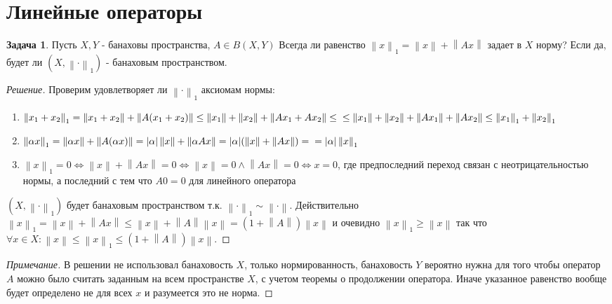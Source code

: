 \documentclass[12pt,a4paper]{article}
\theoremstyle{definition}
\newtheorem{exercise}{Задача}[section]
\newenvironment{solution}
{\renewcommand\qedsymbol{$\blacksquare$}\begin{proof}[Решение]}
{\end{proof}}
\newenvironment{note}
{\renewcommand\qedsymbol{}\begin{proof}[Примечание]}
	{\end{proof}}
\newcommand{\norm}[1]{\left\lVert#1\right\rVert}
\begin{document}
	\section{Линейные операторы}
	
	\begin{exercise}
		Пусть $X,Y$ - банаховы пространства, $A\in B(X,Y)$ Всегда ли равенство $\norm{x}_1 = \norm{x} + \norm{Ax}$ задает в $X$ норму? Если да, будет ли $(X, \norm{\cdot}_1)$ - банаховым пространством.
	\end{exercise}
	\begin{solution}
		Проверим удовлетворяет ли $\norm{\cdot}_1$ аксиомам нормы:
		\begin{enumerate}
			\item $\norm{x_1 + x_2}_1 = \norm{x_1 + x_2} + \norm{A(x_1 + x_2)} \leq \norm{x_1} + \norm{x_2} + \norm{Ax_1 + Ax_2} \leq \newline
			\leq \norm{x_1} + \norm{x_2} + \norm{Ax_1} + \norm{Ax_2}
			\leq \norm{x_1}_1 + \norm{x_2}_1$
			
			\item $\norm{\alpha x}_1 = \norm{\alpha x} + \norm{A(\alpha x)} = |\alpha| \norm{x} + \norm{\alpha Ax} = |\alpha| (\norm{x} + \norm{Ax}) = \newline = |\alpha|\norm{x}_1$
			
			\item $\norm{x}_1 = 0 \Leftrightarrow \norm{x} + \norm{Ax} = 0 \Leftrightarrow \norm{x} = 0 \wedge \norm{Ax} = 0 \Leftrightarrow x = 0$, где предпоследний переход связан с неотрицательностью нормы, а последний с тем что $A0=0$ для линейного оператора
		\end{enumerate}
		$(X, \norm{\cdot}_1)$ будет банаховым пространством т.к. $\norm{\cdot}_1 \sim \norm{\cdot}$. Действительно $\norm{x}_1 = \norm{x} + \norm{Ax} \leq \norm{x} + \norm{A}\norm{x} = (1 + \norm{A})\norm{x}$ и очевидно $\norm{x}_1 \geq \norm{x}$ так что
		$\forall x\in X : \norm{x} \leq \norm{x}_1 \leq (1 + \norm{A})\norm{x}$.
	\end{solution}

	\begin{note}
		В решении не использовал банаховость $X$, только нормированность, банаховость $Y$ вероятно нужна для того чтобы оператор $A$ можно было считать заданным на всем пространстве $X$, с учетом теоремы о продолжении оператора. Иначе указанное равенство вообще будет определено не для всех $x$ и разумеется это не норма.
	\end{note}

	\newpage
	
\end{document}
